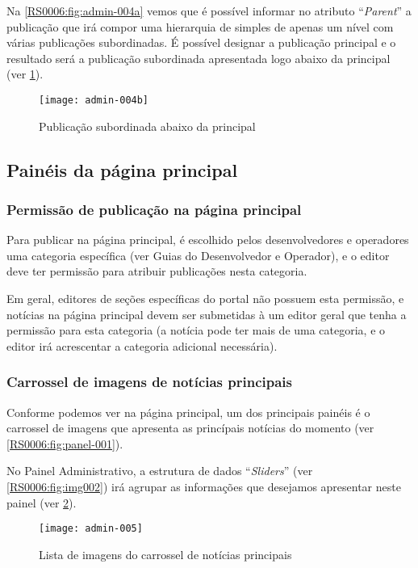 Na \cref{RS0006:fig:admin-004a} vemos que é possível informar no atributo ``\textit{Parent}'' a publicação que irá compor uma hierarquia de simples de apenas um nível com várias publicações subordinadas. É possível designar a publicação principal e o resultado será a publicação subordinada apresentada logo abaixo da principal (ver \cref{RS0006:fig:admin-004b}).

\begin{figure}[!ht]
    \centering
    \texttt{[image: admin-004b]}
    \caption{Publicação subordinada abaixo da principal}\label{RS0006:fig:admin-004b}
\end{figure}

\subsection{Painéis da página principal}

\subsubsection{Permissão de publicação na página principal}

Para publicar na página principal, é escolhido pelos desenvolvedores e operadores uma categoria específica (ver Guias do Desenvolvedor e Operador), e o editor deve ter permissão para atribuir publicações nesta categoria.

Em geral, editores de seções específicas do portal não possuem esta permissão, e notícias na página principal devem ser submetidas à um editor geral que tenha a permissão para esta categoria (a notícia pode ter mais de uma categoria, e o editor irá acrescentar a categoria adicional necessária).

\subsubsection{Carrossel de imagens de notícias principais}

Conforme podemos ver na página principal, um dos principais painéis é o carrossel de imagens que apresenta as princípais notícias do momento (ver \cref{RS0006:fig:panel-001}).

No Painel Administrativo, a estrutura de dados ``\textit{Sliders}'' (ver \cref{RS0006:fig:img002}) irá agrupar as informações que desejamos apresentar neste painel (ver \cref{RS0006:fig:admin-005}).

\begin{figure}[!ht]
    \centering
    \texttt{[image: admin-005]}
    \caption{Lista de imagens do carrossel de notícias principais}\label{RS0006:fig:admin-005}
\end{figure}

